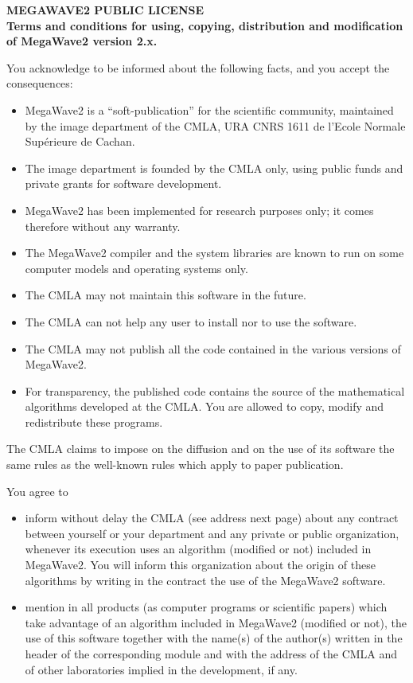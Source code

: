 %
%  

\begin{center}
{\bf\large
MEGAWAVE2 PUBLIC LICENSE \\
Terms and conditions for using, copying, distribution and modification of MegaWave2 version 2.x.
}
\end{center}

You acknowledge to be informed about the following facts, and you accept the consequences:
\begin{itemize}
\item MegaWave2 is a ``soft-publication'' for the scientific community, 
maintained by the image department of the CMLA, URA CNRS 1611 de l'Ecole Normale Sup\'erieure de Cachan.
\item The image department is founded by the CMLA only, using public funds
and private grants for software development.
\item MegaWave2 has been implemented for research purposes only; it comes therefore
without any warranty.
\item The MegaWave2 compiler and the system libraries are known to run on some computer models and operating 
systems only.
\item The CMLA may not maintain this software in the future.
\item The CMLA can not help any user to install nor to use the software.
\item The CMLA may not publish all the code contained in the various versions of MegaWave2.
\item For transparency, the published code contains the source of the mathematical algorithms developed at the 
CMLA.
You are allowed to copy, modify and redistribute these programs.
\end{itemize}

The CMLA claims to impose on the diffusion and on the use of its software the
same rules as the well-known rules which apply to paper publication.

You agree to
\begin{itemize}
\item inform without delay the CMLA (see address next page)
about any contract between yourself or your department and any private or public organization, whenever
its execution uses an algorithm (modified or not) included in MegaWave2.
You will inform this organization about the origin of these algorithms by writing in the contract the use of the 
MegaWave2 software.
\item mention in all products (as computer programs or scientific papers) 
which take advantage of an algorithm included in MegaWave2 (modified or not), the use of this
software together with the name(s) of the author(s) written in the header of 
the corresponding module and with the address of the CMLA and of 
other laboratories implied in the development, if any.
\end{itemize}


